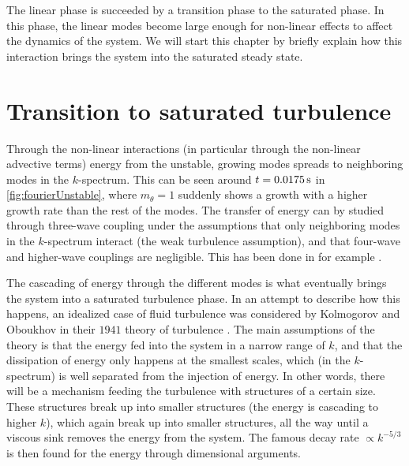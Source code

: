 %
The linear phase is succeeded by a transition phase to the saturated phase.
In this phase, the linear modes become large enough for non-linear effects to affect the dynamics of the system.
We will start this chapter by briefly explain how this interaction brings the system into the saturated steady state.

\section{Transition to saturated turbulence}
Through the non-linear interactions (in particular through the non-linear advective terms) energy from the unstable, growing modes spreads to neighboring modes in the $k$-spectrum.
This can be seen around $t=0.0175\, \text{s}$ in \cref{fig:fourierUnstable}, where $m_\theta=1$ suddenly shows a growth with a higher growth rate than the rest of the modes.
The transfer of energy can by studied through three-wave coupling under the assumptions that only neighboring modes in the $k$-spectrum interact (the weak turbulence assumption), and that four-wave and higher-wave couplings are negligible.
This has been done in for example \cite{Ritz1989,Knorr1990}.

The cascading of energy through the different modes is what eventually brings the system into a saturated turbulence phase.
In an attempt to describe how this happens, an idealized case of fluid turbulence was considered by Kolmogorov and Oboukhov in their $1941$ theory of turbulence \cite{Kolmogorov1962}.
The main assumptions of the theory is that the energy fed into the system in a narrow range of $k$, and that the dissipation of energy only happens at the smallest scales, which (in the $k$-spectrum) is well separated from the injection of energy.
In other words, there will be a mechanism feeding the turbulence with structures of a certain size.
These structures break up into smaller structures (the energy is cascading to higher $k$), which again break up into smaller structures, all the way until a viscous sink removes the energy from the system.
The famous decay rate $\propto k^{-5/3}$ is then found for the energy through dimensional arguments.

